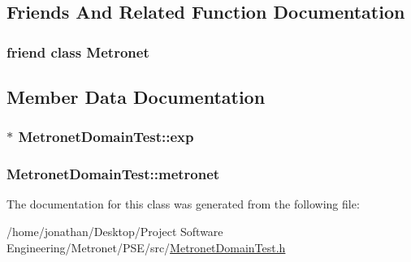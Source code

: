 \subsection{Friends And Related Function Documentation}
\subsubsection[{\texorpdfstring{Metronet}{Metronet}}]{\setlength{\rightskip}{0pt plus 5cm}friend class {\bf Metronet}\hspace{0.3cm}{\ttfamily [friend]}}\hypertarget{class_metronet_domain_test_a07c94fb69880743e62f64a941fc2d4ab}{}\label{class_metronet_domain_test_a07c94fb69880743e62f64a941fc2d4ab}


\subsection{Member Data Documentation}
\subsubsection[{\texorpdfstring{exp}{exp}}]{$\ast$ Metronet\+Domain\+Test\+::exp\hspace{0.3cm}{\ttfamily [protected]}}\hypertarget{class_metronet_domain_test_a6e7c903d4485d95a766f8ff01989d529}{}\label{class_metronet_domain_test_a6e7c903d4485d95a766f8ff01989d529}
\subsubsection[{\texorpdfstring{metronet}{metronet}}]{ Metronet\+Domain\+Test\+::metronet\hspace{0.3cm}{\ttfamily [protected]}}\hypertarget{class_metronet_domain_test_aa185f99af6607124a6fea8c4f63fddb7}{}\label{class_metronet_domain_test_aa185f99af6607124a6fea8c4f63fddb7}


The documentation for this class was generated from the following file\+:\begin{DoxyCompactItemize}
\item 
/home/jonathan/\+Desktop/\+Project Software Engineering/\+Metronet/\+P\+S\+E/src/\hyperlink{_metronet_domain_test_8h}{Metronet\+Domain\+Test.\+h}\end{DoxyCompactItemize}
